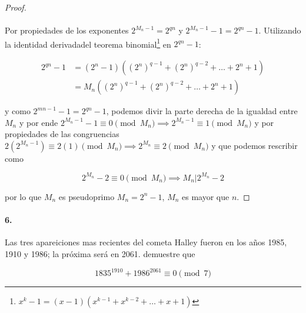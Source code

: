 \documentclass{article}
\begin{document}
\begin{proof}
\paragraph{} Por propiedades de los exponentes $2^{M_n - 1} = 2^{qn}$ y $2^{M_n - 1} - 1 = 2^{qn} - 1$. Utilizando la identidad derivadadel teorema binomial\footnote{$x^k - 1 = (x-1)(x^{k-1} + x^{k-2} + \dots + x + 1)$} en $2^{qn} - 1$:

\begin{align*}
2^{qn} - 1 &= (2^n - 1)((2^n)^{q-1} + (2^n)^{q-2} + \dots + 2^n + 1)\\
&= M_n((2^n)^{q-1} + (2^n)^{q-2} + \dots + 2^n + 1)
\end{align*}

y como $2^{mn -1} - 1 = 2^{qn} - 1$, podemos divir la parte derecha de la igualdad entre $M_n$ y por ende $2^{M_n - 1} - 1 \equiv 0 \pmod{M_n} \implies 2^{M_n - 1} \equiv 1 \pmod{M_n}$ y por propiedades de las congruencias $2(2^{M_n -1}) \equiv 2(1) \pmod{M_n} \implies 2^{M_n} \equiv 2 \pmod{M_n}$ y que podemos rescribir como

$$2^{M_n} - 2 \equiv 0 \pmod{M_n} \implies M_n | 2^{M_n} - 2$$

por lo que $M_n$ es pseudoprimo $M_n = 2^n - 1$, $M_n$ es mayor que $n$.
\end{proof}
	
\paragraph{6.} Las tres apareiciones mas recientes del cometa Halley fueron en los años 1985, 1910 y 1986; la próxima será en 2061. demuestre que

$$1835^{1910} + 1986^{2061} \equiv 0 \pmod{7}$$
\end{document}

